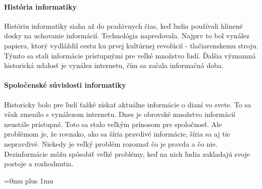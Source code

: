 \documentclass[10pt,twoside,slovak,a4paper]{article}
\begin{document}
\paragraph{História informatiky}
Históriu informatiky siaha až do pradávnych čias, keď ľudia používali hlinené dosky na uchovanie informácií. Technológia napredovala. Najprv to bol vynález papiera, ktorý vydláždil cestu ku prvej kultúrnej revolúcií - tlačiarenskemu stroju. Týmto sa stali informácie prístupnými pre veľké množstvo ľudí. Ďalšia významná historická udalosť je vynález internetu, čím sa začala informačná doba.

\paragraph{Spoločenské súvislosti informatiky}
Historicky bolo pre ľudí ťažké získať aktuálne informácie o dianí vo svete. To sa však zmenilo s vynálezom internetu. Dnes je obrovské množstvo informácií neustále prístupné. Toto sa stalo veľkým prínosom pre spoločnosť. Ale problémom je, že rovnako, ako sa šíria pravdivé informácie, šíria sa aj tie nepravdivé. Niekedy je veľký problém rozoznať čo je pravda a čo nie. Dezinformácie môžu spôsobiť veľké problémy, keď na nich ľudia zakladajú svoje postoje a rozhodnutia. 


\Urlmuskip=0mu plus 1mu
\def\UrlBreaks{\do\/\do-}


\end{document}
